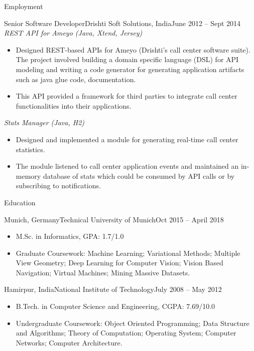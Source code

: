 \documentclass[]{mcdowellcv}
\begin{document}
\begin{cvsection}{Employment}
        \begin{cvsubsection}{Senior Software Developer}{Drishti Soft Solutions, India}{June 2012 -- Sept 2014}
            \textit{REST API for Ameyo (Java, Xtend, Jersey)}
            \begin{itemize}
                \item Designed REST-based APIs for Ameyo (Drishti's call center software suite). The project involved building a domain specific language (DSL) for API modeling and writing a code generator for generating application artifacts such as java glue code, documentation.
                \item This API provided a framework for third parties to integrate call center functionalities into their applications.
            \end{itemize}
            
            \textit{Stats Manager (Java, H2)}
            \begin{itemize}
                \item Designed and implemented a module for generating real-time call center statistics. 
                \item The module listened to call center application events and maintained an in-memory database of stats which could be consumed by API calls or by subscribing to notifications.
            \end{itemize}
        \end{cvsubsection}
    \end{cvsection}
    

    \begin{cvsection}{Education}
        \begin{cvsubsection}{Munich, Germany}{Technical University of Munich}{Oct 2015 -- April 2018}
            \begin{itemize}
                \item M.Sc. in Informatics, GPA: 1.7/1.0
                \item Graduate Coursework: Machine Learning; Variational Methods; Multiple View Geometry; Deep Learning for Computer Vision; Vision Based Navigation; Virtual Machines; Mining Massive Datasets.
            \end{itemize}
        \end{cvsubsection}
        \begin{cvsubsection}{Hamirpur, India}{National Institute of Technology}{July 2008 -- May 2012}
            \begin{itemize}
                \item B.Tech. in Computer Science and Engineering,  CGPA: 7.69/10.0
                \item Undergraduate Coursework: Object Oriented Programming; Data Structure and Algorithms; Theory of Computation; Operating System; Computer Networks; Computer Architecture.
            \end{itemize}
        \end{cvsubsection}
    \end{cvsection}
    
\end{document}
